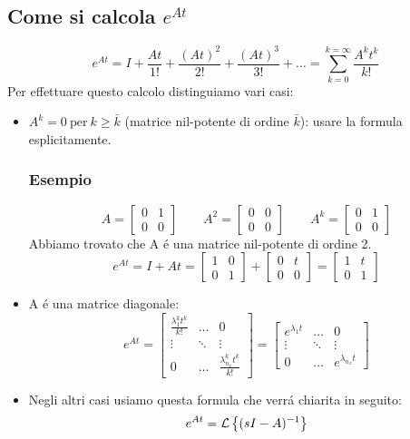 \documentclass[../main.tex]{subfiles}
\begin{document}
	\subsection{Come si calcola $ e^{At} $}
		\[ e^{At} = I + \frac{At}{1!} + \frac{(At)^2}{2!} + \frac{(At)^3}{3!} + \dots = \sum_{k=0}^{k=\infty} \frac{A^k t^k}{k!} \]
		Per effettuare questo calcolo distinguiamo vari casi:
		\begin{itemize}
			\item 
				$ A^k = 0\ \text{per}\ k \geq \bar k $ (matrice nil-potente di ordine $ \bar k $): usare la formula esplicitamente.\\
				\subsubsection*{Esempio}
					\[ A = \left[ \begin{array}{cc} 0 & 1\\ 0 & 0 \end{array} \right] \qquad
					   A^2 = \left[ \begin{array}{cc} 0 & 0\\ 0 & 0 \end{array} \right] \qquad
					   A^k = \left[ \begin{array}{cc} 0 & 1\\ 0 & 0 \end{array} \right] \]
					Abbiamo trovato che A \'e una matrice nil-potente di ordine 2.
					\[ e^{At} = I + At = \left[ \begin{array}{cc} 1 & 0\\ 0 & 1 \end{array} \right] + \left[ \begin{array}{cc} 0 & t\\ 0 & 0 \end{array} \right] = \left[ \begin{array}{cc} 1 & t\\ 0 & 1 \end{array} \right] \]
			\item
				A \'e una matrice diagonale:
				\[ e^{At} = \left[ \begin{array}{ccc} \frac{\lambda_1^k t^k}{k!} & \dots & 0\\ \vdots & \ddots & \vdots\\ 0 & \dots & \frac{\lambda_{n_x}^k t^k}{k!} \end{array} \right] = 
				\left[ \begin{array}{ccc} e^{\lambda_1 t} & \dots & 0\\ \vdots & \ddots & \vdots\\ 0 & \dots & e^{\lambda_{n_x} t} \end{array} \right] \]
			\item
				Negli altri casi usiamo questa formula che verr\'a chiarita in seguito:
				\[ e^{At} = \mathcal{L} \left\lbrace (sI-A)^{-1} \right\rbrace \]

\end{itemize}
\end{document}
